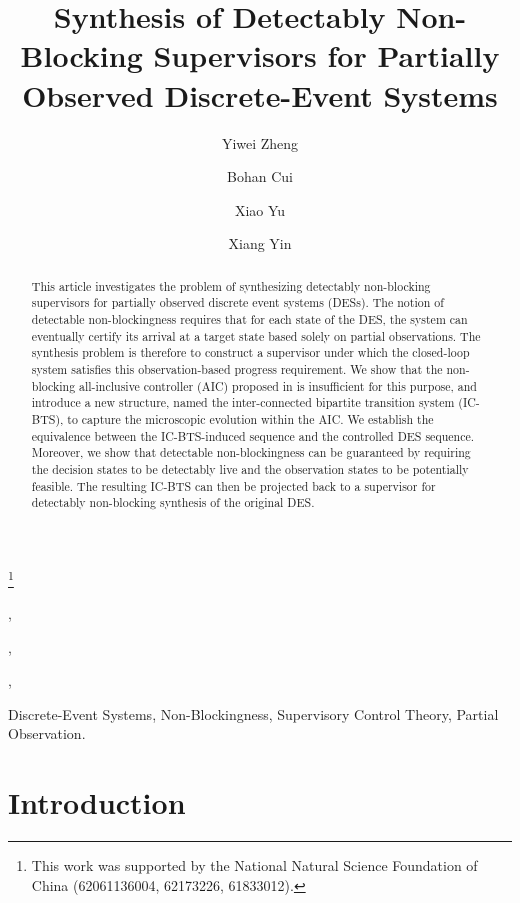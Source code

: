 \documentclass[twocolumn]{autart}
\begin{document}
\begin{frontmatter}
\title{Synthesis of Detectably Non-Blocking Supervisors for Partially Observed Discrete-Event Systems}

\thanks[footnoteinfo]{This work was supported by  the National Natural Science Foundation of China (62061136004, 62173226, 61833012).}
		\author[SJTU1]{Yiwei Zheng},  
		\author[SJTU1]{Bohan Cui},  
		\author[XMU]{Xiao Yu},
		\author[SJTU1]{Xiang Yin} 
		
		\address[SJTU1]{School of Automation and Intelligent Sensing, Shanghai Jiao Tong University, Shanghai 200240, China.}  \address[XMU]{Institute of Artificial Intelligence, Xiamen University, Xiamen 361005, China.}  


  \begin{keyword}
       Discrete-Event Systems, Non-Blockingness, Supervisory Control Theory, Partial Observation.
  \end{keyword}
\begin{abstract}
This article investigates the problem of synthesizing detectably non-blocking supervisors for partially observed discrete event systems (DESs).
The notion of detectable non-blockingness requires that for each state of the DES, the system can eventually certify its arrival at a target state based solely on partial observations.
The synthesis problem is therefore to construct a supervisor under which the closed-loop system satisfies this observation-based progress requirement.
We show that the non-blocking all-inclusive controller (AIC) proposed in \cite{yin2016synthesis} is insufficient for this purpose, and introduce a new structure, named the inter-connected bipartite transition system (IC-BTS), to capture the microscopic evolution within the AIC.
We establish the equivalence between the IC-BTS-induced sequence and the controlled DES sequence.
Moreover, we show that detectable non-blockingness can be guaranteed by requiring the decision states to be detectably live and the observation states to be potentially feasible.
The resulting IC-BTS can then be projected back to a supervisor for detectably non-blocking synthesis of the original DES.
\end{abstract}
\end{frontmatter}	 

\section{Introduction}
\label{sec:intro}
\end{document}
